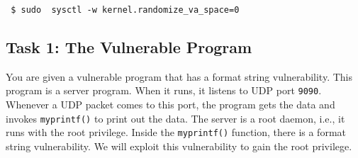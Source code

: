 \begin{lstlisting}
 $ sudo  sysctl -w kernel.randomize_va_space=0
\end{lstlisting}


\subsection{Task 1: The Vulnerable Program}

You are given a vulnerable program that has a format string vulnerability.
This program is a server program. When it runs, it listens to UDP port
\texttt{9090}. Whenever a UDP packet comes to this port, the program
gets the data and invokes \texttt{myprintf()} to print out the data. 
The server is a root daemon, i.e., it runs with the root privilege. 
Inside the \texttt{myprintf()} function, there is a format string
vulnerability. We will exploit this vulnerability to gain the root
privilege.  

